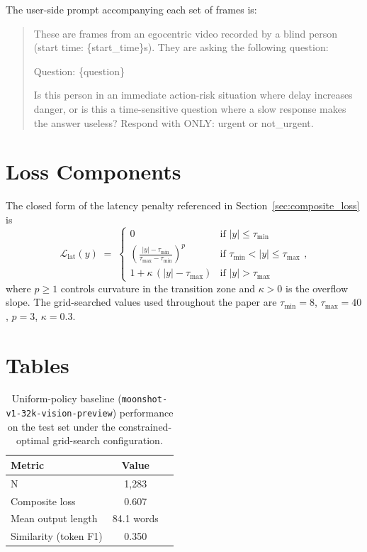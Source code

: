 \documentclass{article}
\begin{document}
The user-side prompt accompanying each set of frames is:

\begin{quote}
\ttfamily\small
These are frames from an egocentric video recorded by a blind person (start time: \{start\_time\}s). They are asking the following question:

\medskip
Question: \{question\}

\medskip
Is this person in an immediate action-risk situation where delay increases danger, or is this a time-sensitive question where a slow response makes the answer useless? Respond with ONLY: urgent or not\_urgent.
\end{quote}


\section{Loss Components}\label{app:loss}

The closed form of the latency penalty referenced in Section~\ref{sec:composite_loss} is
\begin{equation}
\mathcal{L}_{\text{lat}}(y) \;=\;
\begin{cases}
0 & \text{if } |y| \leq \tau_{\min} \\[6pt]
\displaystyle\left(\frac{|y| - \tau_{\min}}{\tau_{\max} - \tau_{\min}}\right)^{\!p} & \text{if } \tau_{\min} < |y| \leq \tau_{\max} \\[8pt]
1 + \kappa\,(|y| - \tau_{\max}) & \text{if } |y| > \tau_{\max}
\end{cases},
\end{equation}
where $p \geq 1$ controls curvature in the transition zone and $\kappa > 0$ is the overflow slope. The grid-searched values used throughout the paper are $\tau_{\min} = 8$, $\tau_{\max} = 40$, $p = 3$, $\kappa = 0.3$.

\section{Tables}\label{app:tables}



\begin{table}[h]
\centering
\caption{Uniform-policy baseline (\texttt{moonshot-v1-32k-vision-preview}) performance on the test set under the constrained-optimal grid-search configuration.}
\label{tab:baseline}
\begin{tabular}{lcc}
\toprule
\textbf{Metric} & \textbf{Value}\\
\midrule
N                     & 1{,}283\\
Composite loss        & 0.607\\
Mean output length    & 84.1 words\\
Similarity (token F1) & 0.350\\
\bottomrule
\end{tabular}
\end{table}
\end{document}
